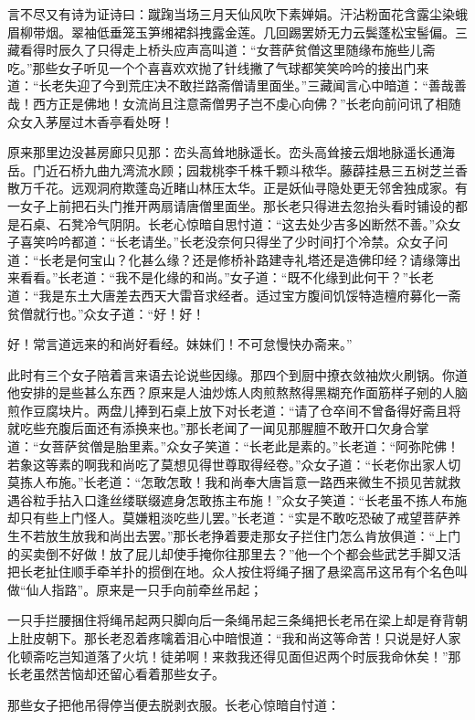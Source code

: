 \documentclass[12pt,UTF8]{ctexbook}
\begin{document}
言不尽又有诗为证诗曰：蹴踘当场三月天仙风吹下素婵娟。汗沾粉面花含露尘染蛾眉柳带烟。翠袖低垂笼玉笋缃裙斜拽露金莲。几回踢罢娇无力云鬓蓬松宝髻偏。三藏看得时辰久了只得走上桥头应声高叫道：“女菩萨贫僧这里随缘布施些儿斋吃。”那些女子听见一个个喜喜欢欢抛了针线撇了气球都笑笑吟吟的接出门来道：“长老失迎了今到荒庄决不敢拦路斋僧请里面坐。”三藏闻言心中暗道：“善哉善哉！西方正是佛地！女流尚且注意斋僧男子岂不虔心向佛？”长老向前问讯了相随众女入茅屋过木香亭看处呀！

原来那里边没甚房廊只见那：峦头高耸地脉遥长。峦头高耸接云烟地脉遥长通海岳。门近石桥九曲九湾流水顾；园栽桃李千株千颗斗秾华。藤薜挂悬三五树芝兰香散万千花。远观洞府欺蓬岛近睹山林压太华。正是妖仙寻隐处更无邻舍独成家。有一女子上前把石头门推开两扇请唐僧里面坐。那长老只得进去忽抬头看时铺设的都是石桌、石凳冷气阴阴。长老心惊暗自思忖道：“这去处少吉多凶断然不善。”众女子喜笑吟吟都道：“长老请坐。”长老没奈何只得坐了少时间打个冷禁。众女子问道：“长老是何宝山？化甚么缘？还是修桥补路建寺礼塔还是造佛印经？请缘簿出来看看。”长老道：“我不是化缘的和尚。”女子道：“既不化缘到此何干？”长老道：“我是东土大唐差去西天大雷音求经者。适过宝方腹间饥馁特造檀府募化一斋贫僧就行也。”众女子道：“好！好！

好！常言道远来的和尚好看经。妹妹们！不可怠慢快办斋来。”

此时有三个女子陪着言来语去论说些因缘。那四个到厨中撩衣敛袖炊火刷锅。你道他安排的是些甚么东西？原来是人油炒炼人肉煎熬熬得黑糊充作面筋样子剜的人脑煎作豆腐块片。两盘儿捧到石桌上放下对长老道：“请了仓卒间不曾备得好斋且将就吃些充腹后面还有添换来也。”那长老闻了一闻见那腥膻不敢开口欠身合掌道：“女菩萨贫僧是胎里素。”众女子笑道：“长老此是素的。”长老道：“阿弥陀佛！若象这等素的啊我和尚吃了莫想见得世尊取得经卷。”众女子道：“长老你出家人切莫拣人布施。”长老道：“怎敢怎敢！我和尚奉大唐旨意一路西来微生不损见苦就救遇谷粒手拈入口逢丝缕联缀遮身怎敢拣主布施！”众女子笑道：“长老虽不拣人布施却只有些上门怪人。莫嫌粗淡吃些儿罢。”长老道：“实是不敢吃恐破了戒望菩萨养生不若放生放我和尚出去罢。”那长老挣着要走那女子拦住门怎么肯放俱道：“上门的买卖倒不好做！放了屁儿却使手掩你往那里去？”他一个个都会些武艺手脚又活把长老扯住顺手牵羊扑的掼倒在地。众人按住将绳子捆了悬梁高吊这吊有个名色叫做“仙人指路”。原来是一只手向前牵丝吊起；

一只手拦腰捆住将绳吊起两只脚向后一条绳吊起三条绳把长老吊在梁上却是脊背朝上肚皮朝下。那长老忍着疼噙着泪心中暗恨道：“我和尚这等命苦！只说是好人家化顿斋吃岂知道落了火坑！徒弟啊！来救我还得见面但迟两个时辰我命休矣！”那长老虽然苦恼却还留心看着那些女子。

那些女子把他吊得停当便去脱剥衣服。长老心惊暗自忖道：
\end{document}
